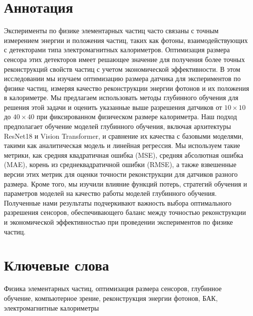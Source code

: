 \documentclass[a4paper,12pt]{extarticle}
\begin{document}
\newpage
\setcounter{page}{2}

{
	\hypersetup{linkcolor=black}
	\tableofcontents
}

\newpage

\newpage

\section*{Аннотация}   %
Эксперименты по физике элементарных частиц часто связаны с точным измерением энергии и положения частиц, таких как фотоны, взаимодействующих с детекторами типа электромагнитных калориметров. Оптимизация размера сенсора этих детекторов имеет решающее значение для получения более точных реконструкций свойств частиц с учетом экономической эффективности. В этом исследовании мы изучаем оптимизацию размера датчика для экспериментов по физике частиц, измеряя качество реконструкции энергии фотонов и их положения в калориметре. Мы предлагаем использовать методы глубинного обучения для решения этой задачи и оценить указанные выше разрешения датчиков от $10 \times 10$ до $40 \times 40$ при фиксированном физическом размере калориметра. Наш подход предполагает обучение моделей глубинного обучения, включая архитектуры ResNet18 и Vision Transformer, и сравнение их качества с базовыми моделями, такими как аналитическая модель и линейная регрессия. Мы используем такие метрики, как средняя квадратичная ошибка (MSE), средняя абсолютная ошибка (MAE), корень из среднеквадратичной ошибки (RMSE), а также взвешенные версии этих метрик для оценки точности реконструкции для датчиков разного размера. Кроме того, мы изучили влияние функций потерь, стратегий обучения и параметров моделей на качество работы моделей глубинного обучения. Полученные нами результаты подчеркивают важность выбора оптимального разрешения сенсоров, обеспечивающего баланс между точностью реконструкции и экономической эффективностью при проведении экспериментов по физике частиц.


\section*{Ключевые слова}
Физика элементарных частиц, оптимизация размера сенсоров, глубинное обучение, компьютерное зрение, реконструкция энергии фотонов, БАК, электромагнитные калориметры
\end{document}
